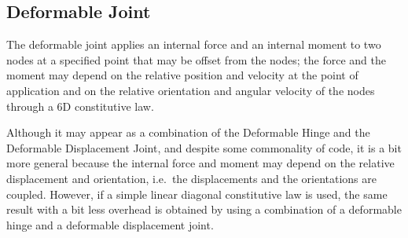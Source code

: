 \documentclass[10pt,dvips,fleqn]{report}
\begin{document}
\subsection{Deformable Joint}
The deformable joint applies an internal force and an internal moment
to two nodes at a specified point that may be offset from the nodes;
the force and the moment may depend on the relative position and velocity
at the point of application and on the relative orientation and angular 
velocity of the nodes through a 6D constitutive law.

Although it may appear as a combination of the Deformable Hinge
and the Deformable Displacement Joint, and despite some commonality
of code, it is a bit more general because the internal force
and moment may depend on the relative displacement and orientation,
i.e.\ the displacements and the orientations are coupled.
However, if a simple linear diagonal constitutive law is used,
the same result with a bit less overhead is obtained by using
a combination of a deformable hinge and a deformable displacement joint.
\end{document}
